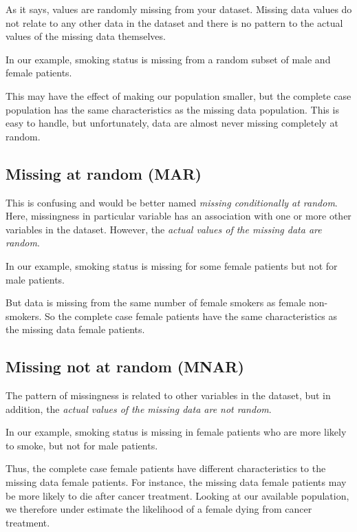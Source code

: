 \documentclass[
  12pt,
  krantz2]{krantz}
\begin{document}
As it says, values are randomly missing from your dataset.
Missing data values do not relate to any other data in the dataset and there is no pattern to the actual values of the missing data themselves.

In our example, smoking status is missing from a random subset of male and female patients.

This may have the effect of making our population smaller, but the complete case population has the same characteristics as the missing data population.
This is easy to handle, but unfortunately, data are almost never missing completely at random.

\hypertarget{missing-at-random-mar}{%
\subsection{Missing at random (MAR)}\label{missing-at-random-mar}}

This is confusing and would be better named \emph{missing conditionally at random}.
Here, missingness in particular variable has an association with one or more other variables in the dataset.
However, the \emph{actual values of the missing data are random}.

In our example, smoking status is missing for some female patients but not for male patients.

But data is missing from the same number of female smokers as female non-smokers.
So the complete case female patients have the same characteristics as the missing data female patients.

\hypertarget{missing-not-at-random-mnar}{%
\subsection{Missing not at random (MNAR)}\label{missing-not-at-random-mnar}}

The pattern of missingness is related to other variables in the dataset, but in addition, the \emph{actual values of the missing data are not random}.

In our example, smoking status is missing in female patients who are more likely to smoke, but not for male patients.

Thus, the complete case female patients have different characteristics to the missing data female patients.
For instance, the missing data female patients may be more likely to die after cancer treatment.
Looking at our available population, we therefore under estimate the likelihood of a female dying from cancer treatment.
\end{document}
